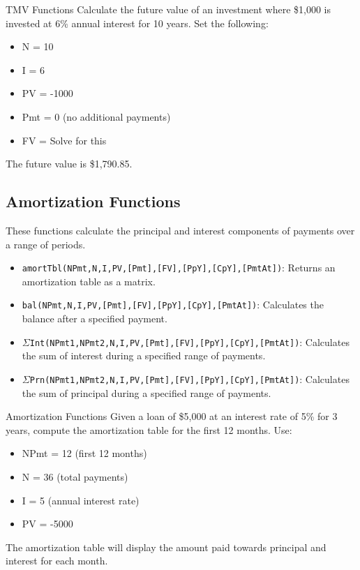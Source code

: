 \begin{examplebox}{TMV Functions}
Calculate the future value of an investment where \$1,000 is invested at 6\% annual interest for 10 years. 
Set the following:
\begin{itemize}
    \item N = 10
    \item I = 6
    \item PV = -1000
    \item Pmt = 0 (no additional payments)
    \item FV = Solve for this
\end{itemize}
The future value is \$1,790.85.
\end{examplebox}

\subsection{Amortization Functions}
These functions calculate the principal and interest components of payments over a range of periods.

\begin{itemize}
    \item \texttt{amortTbl(NPmt,N,I,PV,[Pmt],[FV],[PpY],[CpY],[PmtAt])}: Returns an amortization table as a matrix.
    \item \texttt{bal(NPmt,N,I,PV,[Pmt],[FV],[PpY],[CpY],[PmtAt])}: Calculates the balance after a specified payment.
    \item $\Sigma$\texttt{Int(NPmt1,NPmt2,N,I,PV,[Pmt],[FV],[PpY],[CpY],[PmtAt])}: Calculates the sum of interest during a specified range of payments.
    \item $\Sigma$\texttt{Prn(NPmt1,NPmt2,N,I,PV,[Pmt],[FV],[PpY],[CpY],[PmtAt])}: Calculates the sum of principal during a specified range of payments.
\end{itemize}

\begin{examplebox}{Amortization Functions}
Given a loan of \$5,000 at an interest rate of 5\% for 3 years, compute the amortization table for the first 12 months. Use:
\begin{itemize}
    \item NPmt = 12 (first 12 months)
    \item N = 36 (total payments)
    \item I = 5 (annual interest rate)
    \item PV = -5000
\end{itemize}
The amortization table will display the amount paid towards principal and interest for each month.
\end{examplebox}

